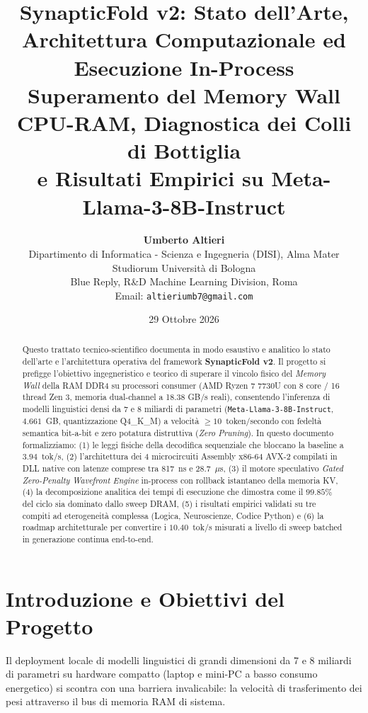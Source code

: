 \documentclass[10pt,a4paper]{article}
\title{\textbf{\LARGE SynapticFold v2: Stato dell'Arte, Architettura Computazionale ed Esecuzione In-Process}\\[0.3em]
\Large Superamento del Memory Wall CPU-RAM, Diagnostica dei Colli di Bottiglia\\
e Risultati Empirici su Meta-Llama-3-8B-Instruct}
\author{\textbf{Umberto Altieri}\\[0.2em]
\small Dipartimento di Informatica - Scienza e Ingegneria (DISI), Alma Mater Studiorum Universit\`a di Bologna\\
\small Blue Reply, R\&D Machine Learning Division, Roma\\
\small Email: \texttt{altieriumb7@gmail.com}}
\date{29 Ottobre 2026}
\theoremstyle{definition}
\begin{document}
\maketitle

\begin{abstract}
Questo trattato tecnico-scientifico documenta in modo esaustivo e analitico lo stato dell'arte e l'architettura operativa del framework \textbf{SynapticFold v2}. Il progetto si prefigge l'obiettivo ingegneristico e teorico di superare il vincolo fisico del \textit{Memory Wall} della RAM DDR4 su processori consumer (AMD Ryzen 7 7730U con 8 core / 16 thread Zen 3, memoria dual-channel a 18.38 GB/s reali), consentendo l'inferenza di modelli linguistici densi da 7 e 8 miliardi di parametri (\texttt{Meta-Llama-3-8B-Instruct}, $4.661$~GB, quantizzazione Q4\_K\_M) a velocit\`a $\ge 10$~token/secondo con fedelt\`a semantica bit-a-bit e zero potatura distruttiva (\textit{Zero Pruning}).
In questo documento formalizziamo: (1) le leggi fisiche della decodifica sequenziale che bloccano la baseline a $3.94$~tok/s, (2) l'architettura dei 4 microcircuiti Assembly x86-64 AVX-2 compilati in DLL native con latenze comprese tra 817~ns e 28.7~$\mu$s, (3) il motore speculativo \textit{Gated Zero-Penalty Wavefront Engine} in-process con rollback istantaneo della memoria KV, (4) la decomposizione analitica dei tempi di esecuzione che dimostra come il $99.85\%$ del ciclo sia dominato dallo sweep DRAM, (5) i risultati empirici validati su tre compiti ad eterogeneit\`a complessa (Logica, Neuroscienze, Codice Python) e (6) la roadmap architetturale per convertire i $10.40$~tok/s misurati a livello di sweep batched in generazione continua end-to-end.
\end{abstract}

\section{Introduzione e Obiettivi del Progetto}

Il deployment locale di modelli linguistici di grandi dimensioni da 7 e 8 miliardi di parametri su hardware compatto (laptop e mini-PC a basso consumo energetico) si scontra con una barriera invalicabile: la velocit\`a di trasferimento dei pesi attraverso il bus di memoria RAM di sistema.
\end{document}
